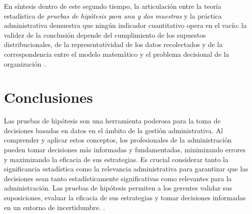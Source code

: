 {En síntesis dentro de este segundo tiempo, la articulación entre la teoría estadística de \textit{pruebas de hipótesis para una y dos muestras} y la práctica administrativa demuestra que ningún indicador cuantitativo opera en el vacío: la validez de la conclusión depende del cumplimiento de los supuestos distribucionales, de la representatividad de los datos recolectados y de la correspondencia entre el modelo matemático y el problema decisional de la organización \citep{anderson2012,nistHandbook,guarin2002}.

\clearpage
\section{Conclusiones}
Las pruebas de hipótesis son una herramienta poderosa para la toma de decisiones basadas en datos en el ámbito de la gestión administrativa. Al comprender y aplicar estos conceptos, los profesionales de la administración pueden tomar decisiones más informadas y fundamentadas, minimizando errores y maximizando la eficacia de sus estrategias. Es crucial considerar tanto la significancia estadística como la relevancia administrativa para garantizar que las decisiones sean tanto estadísticamente significativas como relevantes para la administración. Las pruebas de hipótesis permiten a los gerentes validar sus suposiciones, evaluar la eficacia de sus estrategias y tomar decisiones informadas en un entorno de incertidumbre. \citep{anderson2012,lind2012,wackerly2010,diazRodriguez2022}.
}

